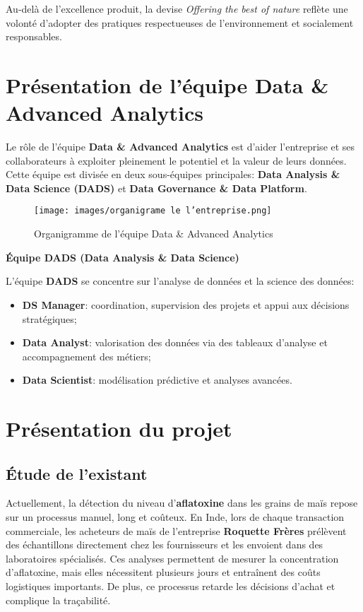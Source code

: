 \documentclass[12pt,a4paper]{report}
\begin{document}
\noindent
Au-delà de l’excellence produit, la devise \textit{Offering the best of nature} reflète une volonté d’adopter des pratiques respectueuses de l’environnement et socialement responsables.

\cleardoublepage
\section{Présentation de l’équipe Data \& Advanced Analytics}

Le rôle de l’équipe \textbf{Data \& Advanced Analytics} est d'aider l’entreprise et ses collaborateurs
à exploiter pleinement le potentiel et la valeur de leurs données.
Cette équipe est divisée en deux sous-équipes principales:
\textbf{Data Analysis \& Data Science (DADS)} et \textbf{Data Governance \& Data Platform}.

\vspace{0.5cm}

\begin{figure}[H]
    \centering
    \texttt{[image: images/organigrame le l'entreprise.png]}
    \caption{Organigramme de l’équipe Data \& Advanced Analytics}
    \label{fig:equipe-data}
\end{figure}
\textbf{Équipe DADS (Data Analysis \& Data Science)}

L’équipe \textbf{DADS} se concentre sur l'analyse de données et la science des données:
\begin{itemize}
    \item \textbf{DS Manager}: coordination, supervision des projets et appui aux décisions stratégiques;
    \item \textbf{Data Analyst}: valorisation des données via des tableaux d’analyse et accompagnement des métiers;
    \item \textbf{Data Scientist}: modélisation prédictive et analyses avancées.
\end{itemize}
\cleardoublepage
\section{Présentation du projet} %

\subsection{Étude de l’existant} %
Actuellement, la détection du niveau d’\textbf{aflatoxine} dans les grains de maïs repose sur un processus manuel, long et coûteux.
En Inde, lors de chaque transaction commerciale, les acheteurs de maïs de l’entreprise \textbf{Roquette Frères} prélèvent des échantillons directement chez les fournisseurs et les envoient dans des laboratoires spécialisés.
Ces analyses permettent de mesurer la concentration d’aflatoxine, mais elles nécessitent plusieurs jours et entraînent des coûts logistiques importants.
De plus, ce processus retarde les décisions d’achat et complique la traçabilité.
\end{document}
